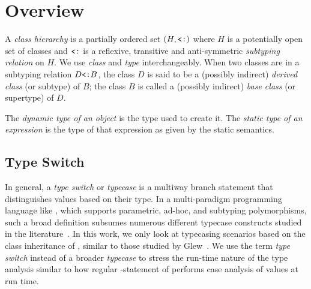 \section{Overview} %
\label{sec:over}

A \emph{class hierarchy} is a partially ordered set $(H,\subtype)$ where $H$ is a potentially open set 
of classes and $\subtype$ is a reflexive, transitive and anti-symmetric 
\emph{subtyping relation} on $H$. We use \emph{class} and \emph{type}  
interchangeably.
When two classes are in a subtyping relation $D \subtype B$, the class $D$
is said to be a (possibly indirect) \emph{derived class} (or subtype) of $B$;
the class $B$ is called a (possibly indirect) \emph{base class}
(or supertype) of $D$.

The %
\emph{dynamic type of an object} is the type used to create it.
The \emph{static type of an expression} is the type of that expression
as given by the static semantics.%

\subsection{Type Switch}

In general, a \emph{type switch} or \emph{typecase} is a multiway branch statement 
that distinguishes values based on their type. In a multi-paradigm programming 
language like \Cpp{}, which supports parametric, ad-hoc, and 
subtyping polymorphisms, such a broad definition subsumes numerous different
typecase constructs studied in the literature~\cite{Intensional95,Glew99,OpenShutTypecase05}. 
In this work, we only look at typecasing scenarios based on the class inheritance 
of \Cpp{}, similar to those studied by Glew~\cite{Glew99}. 
We use the term \emph{type switch} instead of a broader \emph{typecase} to 
stress the run-time nature of the type analysis similar to how regular 
-statement of \Cpp{} performs case analysis of values at run time.

